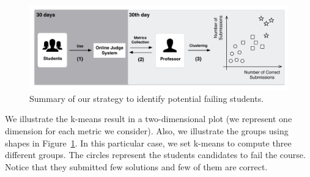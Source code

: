 \begin{figure}[h]
\centering
\includegraphics[width=1.0\textwidth,natwidth=610,natheight=642]{images/Strategy.pdf}
\caption{Summary of our strategy to identify potential failing students.}
\label{fig:strategy}
\end{figure}

We illustrate the k-means result in a two-dimensional plot (we represent one dimension for each metric we consider). Also, we illustrate the groups using shapes in Figure~\ref{fig:strategy}. In this particular case, we set k-means to compute three different groups. The circles represent the students candidates to fail the course. Notice that they submitted few solutions and few of them are correct.


